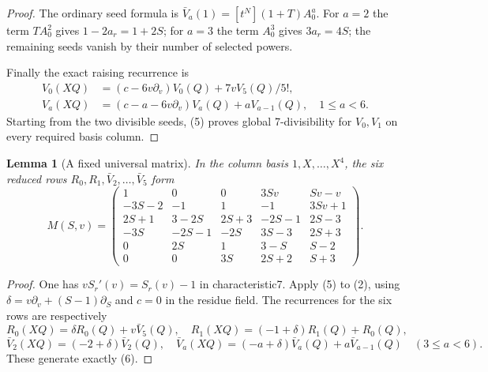 \documentclass[11pt]{article}
\newtheorem{lemma}{Lemma}
\begin{document}
\begin{proof}
The ordinary seed formula is
$\bar V_a(1)=[t^N](1+T)A_0^a$.
For $a=2$ the term $TA_0^2$ gives $1-2a_r=1+2S$;
for $a=3$ the term $A_0^3$ gives $3a_r=4S$;
the remaining seeds vanish by their number of selected powers.

Finally the exact raising recurrence is
\[
 \begin{split}
 V_0(XQ)&=(c-6v\partial_v)V_0(Q)+7vV_5(Q)/5!,\\
 V_a(XQ)&=(c-a-6v\partial_v)V_a(Q)+aV_{a-1}(Q),\quad1\le a<6.
 \end{split}                                                   \tag{5}
\]
Starting from the two divisible seeds, (5) proves global
7-divisibility for $V_0,V_1$ on every required basis column.
\end{proof}

\begin{lemma}[A fixed universal matrix]\label{lem:matrix}
In the column basis $1,X,\ldots,X^4$, the six reduced rows
$R_0,R_1,\bar V_2,\ldots,\bar V_5$ form
\[
 M(S,v)=
 \begin{pmatrix}
 1&0&0&3Sv&Sv-v\\
 -3S-2&-1&1&-1&3Sv+1\\
 2S+1&3-2S&2S+3&-2S-1&2S-3\\
 -3S&-2S-1&-2S&3S-3&2S+3\\
 0&2S&1&3-S&S-2\\
 0&0&3S&2S+2&S+3
 \end{pmatrix}.                                                \tag{6}
\]
\end{lemma}
\begin{proof}
One has $vS_r'(v)=S_r(v)-1$ in characteristic7.
Apply (5) to (2), using
$\delta=v\partial_v+(S-1)\partial_S$ and $c=0$ in the residue field.
The recurrences for the six rows are respectively
\[
 R_0(XQ)=\delta R_0(Q)+v\bar V_5(Q),\quad
 R_1(XQ)=(-1+\delta)R_1(Q)+R_0(Q),
\]
\[
 \bar V_2(XQ)=(-2+\delta)\bar V_2(Q),\quad
 \bar V_a(XQ)=(-a+\delta)\bar V_a(Q)+a\bar V_{a-1}(Q)
                                                  \quad(3\le a<6).
\]
These generate exactly (6).
\end{proof}
\end{document}
